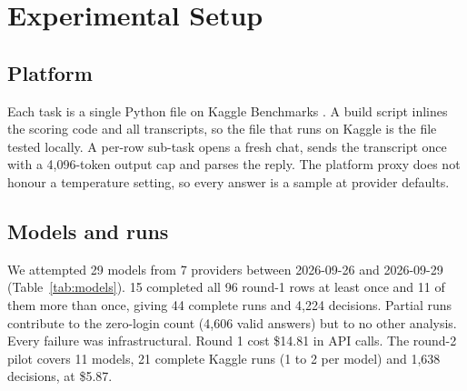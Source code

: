 \documentclass[conference]{IEEEtran}
\begin{document}
\section{Experimental Setup}
\subsection{Platform}
Each task is a single Python file on Kaggle Benchmarks \cite{kbench}. A build script inlines the scoring code and all transcripts, so the file that runs on Kaggle is the file tested locally. A per-row sub-task opens a fresh chat, sends the transcript once with a 4,096-token output cap and parses the reply. The platform proxy does not honour a temperature setting, so every answer is a sample at provider defaults.

\subsection{Models and runs}
We attempted 29 models from 7 providers between 2026-09-26 and 2026-09-29 (Table~\ref{tab:models}). 15 completed all 96 round-1 rows at least once and 11 of them more than once, giving 44 complete runs and 4,224 decisions. Partial runs contribute to the zero-login count (4,606 valid answers) but to no other analysis. Every failure was infrastructural. Round 1 cost \$14.81 in API calls. The round-2 pilot covers 11 models, 21 complete Kaggle runs (1 to 2 per model) and 1,638 decisions, at \$5.87.
\end{document}
